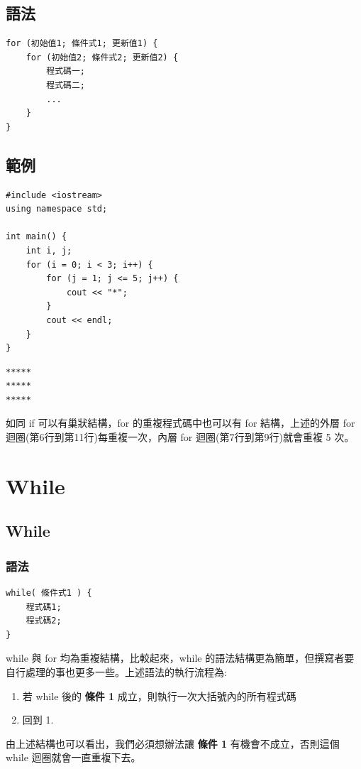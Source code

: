 \documentclass[12pt,a4paper]{article}
\begin{document}
\subsection{語法}
\label{sec:org3e4456d}
\lstset{breaklines=true,language=cpp,label= ,caption= ,captionpos=b,firstnumber=1,numbers=left}
\begin{lstlisting}
for (初始值1; 條件式1; 更新值1) {
    for (初始值2; 條件式2; 更新值2) {
        程式碼一;
        程式碼二;
        ...
    }
}
\end{lstlisting}
\subsection{範例}
\label{sec:org5c90212}
\lstset{breaklines=true,language=cpp,label= ,caption= ,captionpos=b,firstnumber=1,numbers=left}
\begin{lstlisting}
#include <iostream>
using namespace std;

int main() {
    int i, j;
    for (i = 0; i < 3; i++) {
        for (j = 1; j <= 5; j++) {
            cout << "*";
        }
        cout << endl;
    }
}
\end{lstlisting}

\begin{verbatim}
*****
*****
*****
\end{verbatim}


如同 if 可以有巢狀結構，for 的重複程式碼中也可以有 for 結構，上述的外層 for 迴圈(第6行到第11行)每重複一次，內層 for 迴圈(第7行到第9行)就會重複 5 次。

\section{While}
\label{cpp_while}
\subsection{While}
\label{sec:org4fddc11}
\subsubsection{語法}
\label{sec:org1c1bcd5}
\lstset{breaklines=true,language=cpp,label= ,caption= ,captionpos=b,firstnumber=1,numbers=left}
\begin{lstlisting}
while( 條件式1 ) {
    程式碼1;
    程式碼2;
}
\end{lstlisting}
while 與 for 均為重複結構，比較起來，while 的語法結構更為簡單，但撰寫者要自行處理的事也更多一些。上述語法的執行流程為:
\begin{enumerate}
\item 若 while 後的 \textbf{條件 1} 成立，則執行一次大括號內的所有程式碼
\item 回到 1.
\end{enumerate}
由上述結構也可以看出，我們必須想辦法讓 \textbf{條件 1} 有機會不成立，否則這個 while 迴圈就會一直重複下去。
\end{document}
